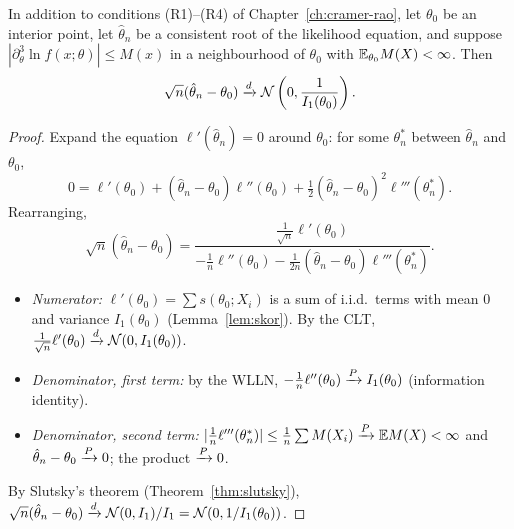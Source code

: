 \documentclass[main.tex]{subfiles}
\begin{document}
\begin{theorem}\label{thm:mle-an}
In addition to conditions (R1)--(R4) of Chapter~\ref{ch:cramer-rao}, let $\theta_0$ be an interior point, let $\hat\theta_n$ be a consistent root of the likelihood equation, and suppose $|\partial^3_\theta\ln f(x;\theta)|\le M(x)$ in a neighbourhood of $\theta_0$ with $\mathbb{E}_{\theta_0}M(X)<\infty$. Then
\[
\sqrt{n}(\hat{\theta}_{n} - \theta_0) \xrightarrow{d} \mathcal{N}\left(0, \frac{1}{I_1(\theta_0)}\right).
\]
\end{theorem}
\begin{proof}
Expand the equation $\ell'(\hat\theta_n)=0$ around $\theta_0$: for some $\theta_n^*$ between $\hat\theta_n$ and $\theta_0$,
\[
0=\ell'(\theta_0)+(\hat\theta_n-\theta_0)\ell''(\theta_0)+\tfrac12(\hat\theta_n-\theta_0)^2\ell'''(\theta_n^*).
\]
Rearranging,
\[
\sqrt n(\hat\theta_n-\theta_0)=\frac{\frac{1}{\sqrt n}\ell'(\theta_0)}{-\frac1n\ell''(\theta_0)-\frac1{2n}(\hat\theta_n-\theta_0)\ell'''(\theta_n^*)} .
\]
\begin{itemize}
  \item \emph{Numerator:} $\ell'(\theta_0)=\sum s(\theta_0;X_i)$ is a sum of i.i.d.\ terms with mean $0$ and variance $I_1(\theta_0)$ (Lemma~\ref{lem:skor}). By the CLT, $\frac{1}{\sqrt n}\ell'(\theta_0)\xrightarrow{d}\mathcal{N}(0,I_1(\theta_0))$.
  \item \emph{Denominator, first term:} by the WLLN, $-\frac1n\ell''(\theta_0)\xrightarrow{P} I_1(\theta_0)$ (information identity).
  \item \emph{Denominator, second term:} $|\frac1n\ell'''(\theta^*_n)|\le\frac1n\sum M(X_i)\xrightarrow{P}\mathbb{E} M(X)<\infty$ and $\hat\theta_n-\theta_0\xrightarrow{P}0$; the product $\xrightarrow{P}0$.
\end{itemize}
By Slutsky's theorem (Theorem~\ref{thm:slutsky}), $\sqrt n(\hat\theta_n-\theta_0)\xrightarrow{d}\mathcal{N}(0,I_1)/I_1=\mathcal{N}(0,1/I_1(\theta_0))$.
\end{proof}
\end{document}
